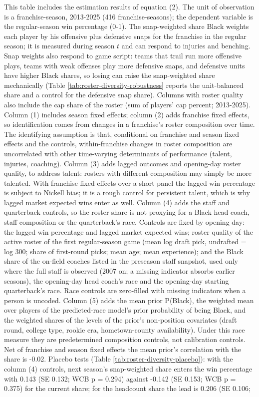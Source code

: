 \begin{table}[!h]
{\begin{threeparttable}
\begin{tablenotes}[para]
\item This table includes the estimation results of equation (2). The unit of observation is a franchise-season, 2013-2025 (416 franchise-seasons); the dependent variable is the regular-season win percentage (0-1). The snap-weighted share Black weights each player by his offensive plus defensive snaps for the franchise in the regular season; it is measured during season $t$ and can respond to injuries and benching. Snap weights also respond to game script: teams that trail run more offensive plays, teams with weak offenses play more defensive snaps, and defensive units have higher Black shares, so losing can raise the snap-weighted share mechanically (Table \ref{tab:roster-diversity-robustness} reports the unit-balanced share and a control for the defensive snap share). Columns with roster quality also include the cap share of the roster (sum of players' cap percent; 2013-2025). Column (1) includes season fixed effects; column (2) adds franchise fixed effects, so identification comes from changes in a franchise's roster composition over time. The identifying assumption is that, conditional on franchise and season fixed effects and the controls, within-franchise changes in roster composition are uncorrelated with other time-varying determinants of performance (talent, injuries, coaching). Column (3) adds lagged outcomes and opening-day roster quality, to address talent: rosters with different composition may simply be more talented. With franchise fixed effects over a short panel the lagged win percentage is subject to Nickell bias; it is a rough control for persistent talent, which is why lagged market expected wins enter as well. Column (4) adds the staff and quarterback controls, so the roster share is not proxying for a Black head coach, staff composition or the quarterback's race. Controls are fixed by opening day: the lagged win percentage and lagged market expected wins; roster quality of the active roster of the first regular-season game (mean log draft pick, undrafted = log 300; share of first-round picks; mean age; mean experience); and the Black share of the on-field coaches listed in the preseason staff snapshot, used only where the full staff is observed (2007 on; a missing indicator absorbs earlier seasons), the opening-day head coach's race and the opening-day starting quarterback's race. Race controls are zero-filled with missing indicators when a person is uncoded. Column (5) adds the mean prior P(Black), the weighted mean over players of the predicted-race model's prior probability of being Black, and the weighted shares of the levels of the prior's non-position covariates (draft round, college type, rookie era, hometown-county availability). Under this race measure they are predetermined composition controls, not calibration controls. Net of franchise and season fixed effects the mean prior's correlation with the  share is -0.02. Placebo tests (Table \ref{tab:roster-diversity-placebo}): with the column (4) controls, next season's snap-weighted share enters the win percentage with 0.143 (SE 0.132; WCB p = 0.294) against -0.142 (SE 0.153; WCB p = 0.375) for the current share; for the headcount share the lead is 0.206 (SE 0.106; 
\end{tablenotes}
\end{threeparttable}}
\end{table}

